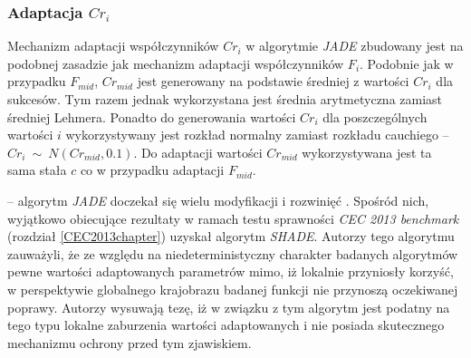 \documentclass[12pt,a4paper]{report}
\begin{document}
{{{\begin{description}
\subsubsection{Adaptacja $Cr_i$}
\par{
Mechanizm adaptacji współczynników $Cr_i$ w algorytmie \emph{JADE} zbudowany jest na podobnej zasadzie jak mechanizm adaptacji współczynników $F_i$. Podobnie jak w przypadku $F_{mid}$, $Cr_{mid}$ jest generowany na podstawie średniej z wartości $Cr_i$ dla sukcesów. Tym razem jednak wykorzystana jest średnia arytmetyczna zamiast średniej Lehmera. Ponadto do generowania wartości $Cr_i$ dla poszczególnych wartości $i$ wykorzystywany jest rozkład normalny zamiast rozkładu cauchiego -- \\ $Cr_i~\sim~N(Cr_{mid}, 0.1)$. Do adaptacji wartości $Cr_{mid}$ wykorzystywana jest ta sama stała $c$ co w przypadku adaptacji $F_{mid}$.
}
\item[SHADE]\cite{SHADE} -- algorytm \emph{JADE} doczekał się wielu modyfikacji i rozwinięć \cite{SHADE, JADEexMultiStart, zhang2009adaptive, JADEexOverviewNumerical, JADEexLargeScale, JADEDiscrette, JADE2}. Spośród nich, wyjątkowo obiecujące rezultaty w ramach testu sprawności \emph{CEC 2013 benchmark} (rozdział \ref{CEC2013chapter}) uzyskał algorytm \emph{SHADE}. Autorzy tego algorytmu zauważyli, że ze względu na niedeterministyczny charakter badanych algorytmów pewne wartości adaptowanych parametrów mimo, iż lokalnie przyniosły korzyść, w perspektywie globalnego krajobrazu badanej funkcji nie przynoszą oczekiwanej poprawy. Autorzy wysuwają tezę, iż w związku z tym algorytm jest podatny na tego typu lokalne zaburzenia wartości adaptowanych i nie posiada skutecznego mechanizmu ochrony przed tym zjawiskiem.


\end{description}}}}
\end{document}
